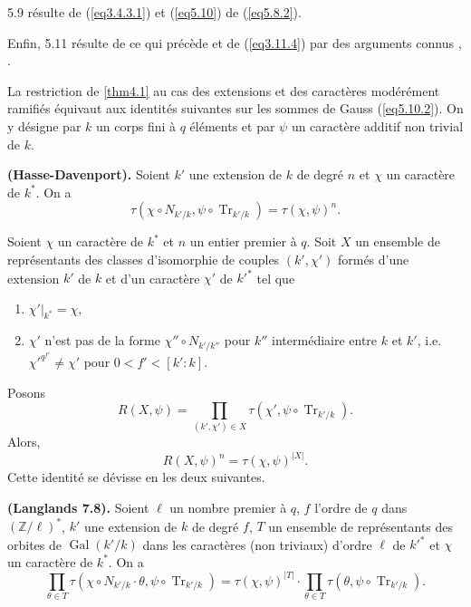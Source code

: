 \documentclass[11pt,a4paper]{amsart}
\theoremstyle{plain}
\theoremstyle{definition}
\DeclareMathOperator{\Gal}{Gal}
\DeclareMathOperator{\Tr}{Tr}
\newcommand{\dbZ}{\mathbb{Z}}
\newenvironment{para}{\par\noindent}{\par}
\begin{document}
5.9 r\'esulte de (\ref{eq3.4.3.1}) et (\ref{eq5.10}) de (\ref{eq5.8.2}).

Enfin, 5.11 r\'esulte de ce qui pr\'ec\`ede et de (\ref{eq3.11.4}) par des arguments connus \cite{1}, \cite{19}.

La restriction de \ref{thm4.1} au cas des extensions et des caract\`eres mod\'er\'ement ramifi\'es \'equivaut aux identit\'es suivantes sur les sommes de Gauss (\ref{eq5.10.2}). On y d\'esigne par $k$ un corps fini \`a $q$ \'el\'ements et par $\psi$ un caract\`ere additif non trivial de $k$.

\begin{para}\textbf{(Hasse-Davenport).}
Soient $k'$ une extension de $k$ de degr\'e $n$ et $\chi$ un caract\`ere de $k^{*}$. On a
\begin{equation}
\tau(\chi \circ N_{k'/k}, \psi \circ \Tr_{k'/k}) = \tau(\chi,\psi)^{n}.
\end{equation}
\end{para}

\begin{para}
Soient $\chi$ un caract\`ere de $k^{*}$ et $n$ un entier premier \`a $q$. Soit $X$ un ensemble de repr\'esentants des classes d'isomorphie de couples $(k',\chi')$ form\'es d'une extension $k'$ de $k$ et d'un caract\`ere $\chi'$ de $k'^{*}$ tel que
\begin{enumerate}
\item[(a)] $\chi'|_{k^{*}} = \chi$,
\item[(b)] $\chi'$ n'est pas de la forme $\chi'' \circ N_{k'/k''}$ pour $k''$ interm\'ediaire entre $k$ et $k'$, i.e.~$\chi'^{q^{f'}} \not= \chi'$ pour $0 < f' < [k':k]$.
\end{enumerate}
Posons
\[
R(X,\psi) = \prod_{(k',\chi') \in X} \tau(\chi', \psi \circ \Tr_{k'/k}).
\]
Alors,
\begin{equation}
R(X,\psi)^{n} = \tau(\chi,\psi)^{|X|}.
\end{equation}
Cette identit\'e se d\'evisse en les deux suivantes.
\end{para}

\begin{para}\textbf{(Langlands \cite{9} 7.8).}
Soient $\ell$ un nombre premier \`a $q$, $f$ l'ordre de $q$ dans $(\dbZ/\ell)^{*}$, $k'$ une extension de $k$ de degr\'e $f$, $T$ un ensemble de repr\'esentants des orbites de $\Gal(k'/k)$ dans les caract\`eres (non triviaux) d'ordre $\ell$ de $k'^{*}$ et $\chi$ un caract\`ere de $k^{*}$. On a
\[
\prod_{\theta \in T} \tau(\chi \circ N_{k'/k} \cdot \theta, \psi \circ \Tr_{k'/k}) = \tau(\chi,\psi)^{|T|} \cdot \prod_{\theta \in T} \tau(\theta, \psi \circ \Tr_{k'/k}).
\]
\end{para}
\end{document}
